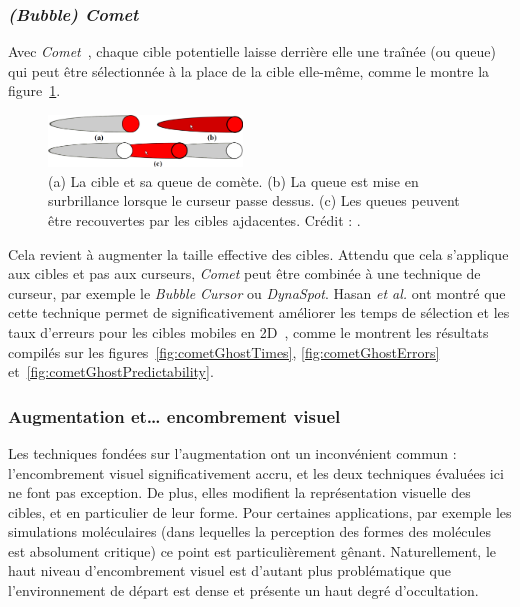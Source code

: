 	\subsubsection{\emph{(Bubble) Comet}}
	Avec \emph{Comet}~\cite{hasan2011comet}, chaque cible potentielle laisse derrière elle une traînée (ou queue) qui peut être sélectionnée à la place de la cible elle-même, comme le montre la figure~\ref{fig:comet}.

	\begin{figure} %
		\centering
		\includegraphics[width=0.46\textwidth]{figures/ch2/comet}
		\caption[La technique \emph{Comet}]{(a) La cible et sa queue de comète. (b) La queue est mise en surbrillance lorsque le curseur passe dessus. (c) Les queues peuvent être recouvertes par les cibles ajdacentes. Crédit : \cite{hasan2011comet}.}
		\label{fig:comet}
	\end{figure}
	
	Cela revient à augmenter la taille effective des cibles. Attendu que cela s'applique aux cibles et pas aux curseurs, \emph{Comet} peut être combinée à une technique de curseur, par exemple le \emph{Bubble Cursor} ou \emph{DynaSpot}. Hasan \emph{et al.} ont montré que cette technique permet de significativement améliorer les temps de sélection et les taux d'erreurs pour les cibles mobiles en 2D~\cite{hasan2011comet}, comme le montrent les résultats compilés sur les figures~\ref{fig:cometGhostTimes}, \ref{fig:cometGhostErrors} et~\ref{fig:cometGhostPredictability}.

	\subsubsection{Augmentation et\ldots{} encombrement visuel}
	Les techniques fondées sur l'augmentation ont un inconvénient commun : l'encombrement visuel significativement accru, et les deux techniques évaluées ici ne font pas exception. De plus, elles modifient la représentation visuelle des cibles, et en particulier de leur forme. Pour certaines applications, par exemple les simulations moléculaires (dans lequelles la perception des formes des molécules est absolument critique) ce point est particulièrement gênant. Naturellement, le haut niveau d'encombrement visuel est d'autant plus problématique que l'environnement de départ est dense et présente un haut degré d'occultation.
	
